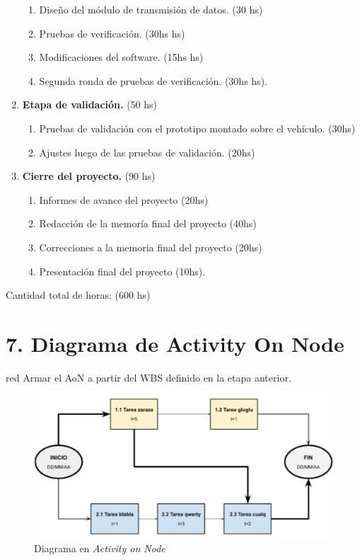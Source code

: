 \documentclass[11pt]{charter}
\begin{document}
\begin{enumerate}
\begin{enumerate}
	\item Diseño del módulo de transmisión de datos. (30 hs)
	\item Pruebas de verificación. (30hs hs)
	\item Modificaciones del software. (15hs hs)
	\item Segunda ronda de pruebas de verificación. (30hs hs).
	\end{enumerate}
\item \textbf{Etapa de validación.} (50 hs)
	\begin{enumerate}
	\item Pruebas de validación con el prototipo montado sobre el vehículo. (30hs)
	\item Ajustes luego de las pruebas de validación. (20hs)
	\end{enumerate}
\item \textbf{Cierre del proyecto.} (90 hs)
	\begin{enumerate}
	\item Informes de avance del proyecto (20hs)
	\item Redacción de la memoría final del proyecto (40hs)
	\item Correcciones a la memoria final del proyecto (20hs)
	\item Presentación final del proyecto (10hs).
	\end{enumerate}
\end{enumerate}

Cantidad total de horas: (600 hs)


\section{7. Diagrama de Activity On Node}
\label{sec:AoN}

\begin{consigna}{red}
Armar el AoN a partir del WBS definido en la etapa anterior. 



\end{consigna}

\begin{figure}[htpb]
\centering 
\includegraphics[width=.8\textwidth]{./Figuras/AoN.png}
\caption{Diagrama en \textit{Activity on Node}}
\label{fig:AoN}
\end{figure}
\end{document}
